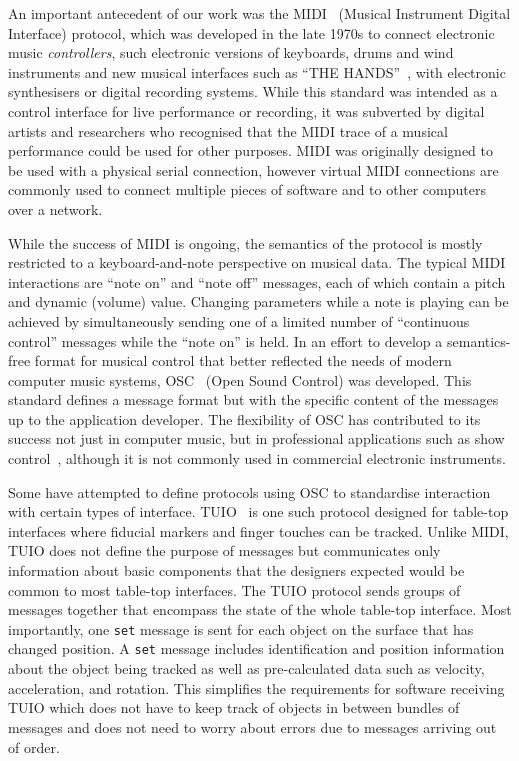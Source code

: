 \documentclass[graybox]{svmult}
\begin{document}

An important antecedent of our work was the
MIDI~\cite{midi1996complete} (Musical Instrument Digital Interface)
protocol, which was developed in the late 1970s to connect electronic
music \emph{controllers}, such electronic versions of keyboards, drums
and wind instruments and new musical interfaces such as ``THE
HANDS''~\cite{TheHandsArticle}, with electronic synthesisers or
digital recording systems. While this standard was intended as a
control interface for live performance or recording, it was subverted
by digital artists and researchers who recognised that the MIDI trace
of a musical performance could be used for other purposes. MIDI was
originally designed to be used with a physical serial connection,
however virtual MIDI connections are commonly used to connect multiple
pieces of software and to other computers over a
network\cite{Lazzaro:2004pb}.

While the success of MIDI is ongoing, the semantics of the protocol is
mostly restricted to a keyboard-and-note perspective on musical data.
The typical MIDI interactions are ``note on'' and ``note off''
messages, each of which contain a pitch and dynamic (volume) value.
Changing parameters while a note is playing can be achieved by
simultaneously sending one of a limited number of ``continuous
control'' messages while the ``note on'' is held. In an effort to
develop a semantics-free format for musical control that better
reflected the needs of modern computer music systems,
OSC~\cite{osc-nime2009} (Open Sound Control) was developed. This
standard defines a message format but with the specific content of the
messages up to the application developer. The flexibility of OSC has
contributed to its success not just in computer music, but in
professional applications such as show
control~\cite{schmeder2010best}, although it is not commonly used in
commercial electronic instruments.

Some have attempted to define protocols using OSC to standardise
interaction with certain types of interface. TUIO~\cite{TUIO_KBBC05}
is one such protocol designed for table-top interfaces where fiducial
markers and finger touches can be tracked. Unlike MIDI, TUIO does not
define the purpose of messages but communicates only information about
basic components that the designers expected would be common to most
table-top interfaces. The TUIO protocol sends groups of messages
together that encompass the state of the whole table-top interface.
Most importantly, one \texttt{set} message is sent for each object on
the surface that has changed position. A \texttt{set} message includes
identification and position information about the object being tracked
as well as pre-calculated data such as velocity, acceleration, and
rotation. This simplifies the requirements for software receiving TUIO
which does not have to keep track of objects in between bundles of
messages and does not need to worry about errors due to messages arriving out of order.
\end{document}

